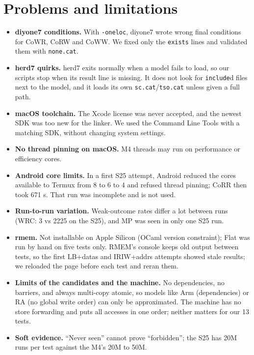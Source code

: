 \documentclass[11pt]{article}
\begin{document}
\section{Problems and limitations}
\begin{itemize}
  \item \textbf{diyone7 conditions.} With \texttt{-oneloc}, diyone7 wrote wrong final conditions for
        CoWR, CoRW and CoWW. We fixed only the \texttt{exists} lines and validated them with
        \texttt{none.cat}.
  \item \textbf{herd7 quirks.} herd7 exits normally when a model fails to load, so our scripts stop when
        its result line is missing. It does not look for \texttt{include}d files next to the model, and it
        loads its own \texttt{sc.cat}/\texttt{tso.cat} unless given a full path.
  \item \textbf{macOS toolchain.} The Xcode license was never accepted, and the newest SDK was too new
        for the linker. We used the Command Line Tools with a matching SDK, without changing system
        settings.
  \item \textbf{No thread pinning on macOS.} M4 threads may run on performance or efficiency cores.
  \item \textbf{Android core limits.} In a first S25 attempt, Android reduced the cores available to
        Termux from 8 to 6 to 4 and refused thread pinning; CoRR then took 671 s. That run was
        incomplete and is not used.
  \item \textbf{Run-to-run variation.} Weak-outcome rates differ a lot between runs (WRC: 3 vs 2225 on
        the S25), and MP was seen in only one S25 run.
  \item \textbf{rmem.} Not installable on Apple Silicon (OCaml version constraint); Flat was run by hand on
        five tests only. RMEM's console keeps old output between tests, so the first LB+datas and
        IRIW+addrs attempts showed stale results; we reloaded the page before each test and reran them.
  \item \textbf{Limits of the candidates and the machine.} No dependencies, no barriers, and always
        multi-copy atomic, so models like Arm (dependencies) or RA (no global write order) can only be
        approximated. The machine has no store forwarding and puts all accesses in one order; neither
        matters for our 13 tests.
  \item \textbf{Soft evidence.} ``Never seen'' cannot prove ``forbidden''; the S25 has 20M runs per test
        against the M4's 20M to 50M.
\end{itemize}
\end{document}
